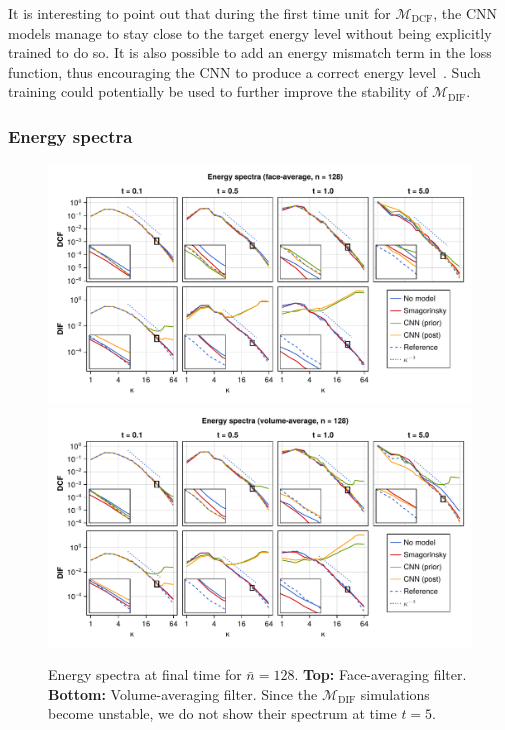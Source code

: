 \documentclass[preprint]{elsarticle}
\newcommand{\R}[1]{}
\newcommand{\revone}[1]{#1}
\newcommand{\revboth}[1]{#1}
\begin{document}
\revone{
    \R{energy_in_loss}
    It is interesting to point out that during the first time unit for
    $\mathcal{M}_\text{DCF}$, the CNN models manage to stay close to the target
    energy level without being explicitly trained to do so. It is also possible
    to add an energy mismatch term in the loss function, thus encouraging the
    CNN to produce a correct energy level~\cite{List2022}. Such training could
    potentially be used to further improve the stability of
    $\mathcal{M}_\text{DIF}$.
}

\subsubsection{Energy spectra}

\begin{figure}
    \centering
    \includegraphics[width=\textwidth]{figures_kolmogorov_spectra_filter=FaceAverage_nles=128.pdf}
    \includegraphics[width=\textwidth]{figures_kolmogorov_spectra_filter=VolumeAverage_nles=128.pdf}
    \caption{Energy spectra at final time for
        $\bar{n} = 128$.
        \textbf{Top:} Face-averaging filter.
        \textbf{Bottom:} Volume-averaging filter.
        \revboth{Since the $\mathcal{M}_\text{DIF}$ simulations become unstable,
        we do not show their spectrum at time $t = 5$.}
    }
    \label{fig:energy_spectra}
\end{figure}
\end{document}
